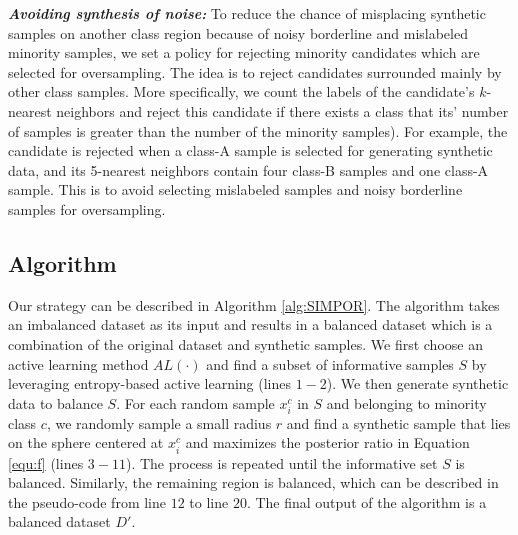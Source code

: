 \textbf{\textit{Avoiding synthesis of noise:}} To reduce the chance of misplacing synthetic samples on another class region because of noisy borderline and mislabeled minority samples, we set a policy for rejecting minority candidates which are selected for oversampling. The idea is to reject candidates surrounded mainly by other class samples. More specifically, we count the labels of the candidate's $k$-nearest neighbors and reject this candidate if there exists a class that its' number of samples is greater than the number of the minority samples). For example, the candidate is rejected when a class-A sample is selected for generating synthetic data, and its 5-nearest neighbors contain four class-B samples and one class-A sample. This is to avoid selecting mislabeled samples and noisy borderline samples for oversampling.        

\subsection{Algorithm}
Our strategy can be described in Algorithm \ref{alg:SIMPOR}. The algorithm takes an imbalanced dataset as its input and results in a balanced dataset which is a combination of the original dataset and synthetic samples. We first choose an active learning method $AL(\cdot)$ and find a subset of informative samples $S$ by leveraging entropy-based active learning (lines $1-2$). We then generate synthetic data to balance $S$. For each random sample $x_i^c$ in $S$ and belonging to minority class $c$, we randomly sample a small radius $r$ and find a synthetic sample that lies on the sphere centered at $x_i^c$ and maximizes the posterior ratio in Equation \ref{equ:f} (lines $3-11$). The process is repeated until the informative set $S$ is balanced. Similarly, the remaining region is balanced, which can be described in the pseudo-code from line $12$ to line $20$. The final output of the algorithm is a balanced dataset $D'$.       

